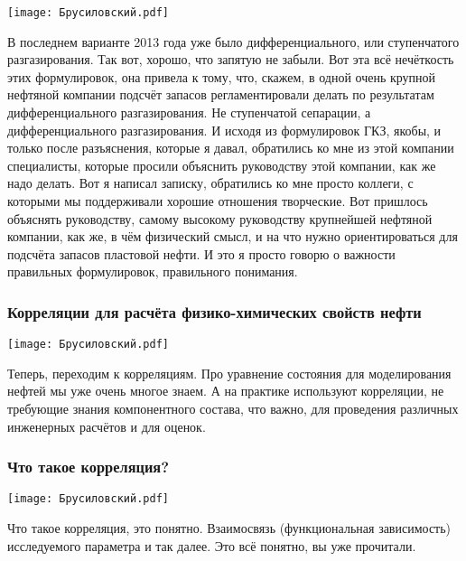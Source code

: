 \documentclass[main.tex]{subfiles}
\begin{document}
\begin{center}
\texttt{[image: Брусиловский.pdf]}
\end{center}

В последнем варианте 2013 года уже было дифференциального, или ступенчатого разгазирования.
Так вот, хорошо, что запятую не забыли.
Вот эта всё нечёткость этих формулировок, она привела к тому, что, скажем, в одной очень крупной нефтяной компании подсчёт запасов регламентировали делать по результатам дифференциального разгазирования.
Не ступенчатой сепарации, а дифференциального разгазирования.
И исходя из формулировок ГКЗ, якобы, и только после разъяснения, которые я давал, обратились ко мне из этой компании специалисты, которые просили объяснить руководству этой компании, как же надо делать.
Вот я написал записку, обратились ко мне просто коллеги, с которыми мы поддерживали хорошие отношения творческие.
Вот пришлось объяснять руководству, самому высокому руководству крупнейшей нефтяной компании, как же, в чём физический смысл, и на что нужно ориентироваться для подсчёта запасов пластовой нефти.
И это я просто говорю о важности правильных формулировок, правильного понимания.

\subsubsection{Корреляции для расчёта физико-химических свойств нефти}

\begin{center}
\texttt{[image: Брусиловский.pdf]}
\end{center}

Теперь, переходим к корреляциям.
Про уравнение состояния для моделирования нефтей мы уже очень многое знаем.
А на практике используют корреляции, не требующие знания компонентного состава, что важно, для проведения различных инженерных расчётов и для оценок.

\subsubsection{Что такое корреляция?}

\begin{center}
\texttt{[image: Брусиловский.pdf]}
\end{center}

Что такое корреляция, это понятно.
Взаимосвязь (функциональная зависимость) исследуемого параметра и так далее.
Это всё понятно, вы уже прочитали.
\end{document}
